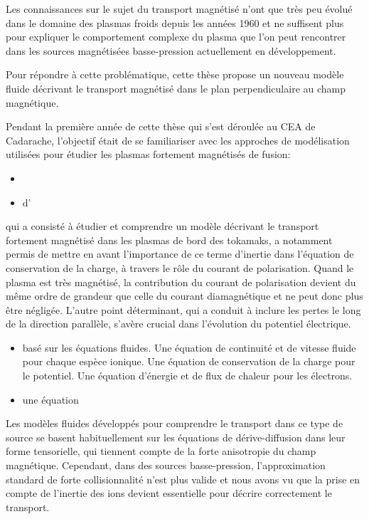 Les connaissances sur le sujet du transport magnétisé n'ont que très peu évolué
dans le domaine des plasmas froids depuis les années 1960 et ne suffisent plus
pour expliquer le comportement complexe du plasma que l'on peut
rencontrer dans les sources magnétisées basse-pression actuellement en développement.

Pour répondre à cette problématique, cette thèse propose un nouveau
modèle fluide décrivant le transport magnétisé dans le plan perpendiculaire au
champ magnétique.

Pendant la première année de cette thèse qui s'est déroulée au CEA de Cadarache,
l'objectif était de se familiariser avec les approches de modélisation
utilisées pour étudier les plasmas fortement magnétisés de fusion:
\begin{itemize}
  \item 
  \item d'
\end{itemize} 
  qui a consisté à étudier et comprendre un
modèle décrivant le transport fortement magnétisé dans les plasmas de bord des tokamaks, a notamment permis de mettre en avant l'importance de ce terme d'inertie dans l'équation de conservation de la charge, à travers le rôle
du courant de polarisation.
Quand le plasma est très magnétisé, la contribution du courant de polarisation
devient du même ordre de grandeur que celle du courant diamagnétique et ne
peut donc plus être négligée. L'autre point déterminant, qui a conduit à
inclure les pertes le long de la direction parallèle, s'avère crucial dans
l'évolution du potentiel électrique.

\begin{itemize}
  \item basé sur les équations fluides. Une équation de continuité et de vitesse
  fluide pour chaque espèce ionique. Une équation de conservation de la charge
  pour le potentiel. Une équation d'énergie et de flux de chaleur pour les
  électrons.
  \item une équation 
\end{itemize} 

Les modèles fluides développés pour comprendre le transport dans ce type de
source se basent habituellement sur les équations de dérive-diffusion dans leur
forme tensorielle, qui tiennent compte de la forte anisotropie du champ
magnétique.
Cependant, dans des sources basse-pression,
l'approximation standard de forte collisionnalité n'est plus
valide et nous avons vu que la prise en compte de l'inertie des ions devient
essentielle pour décrire correctement le transport. 



